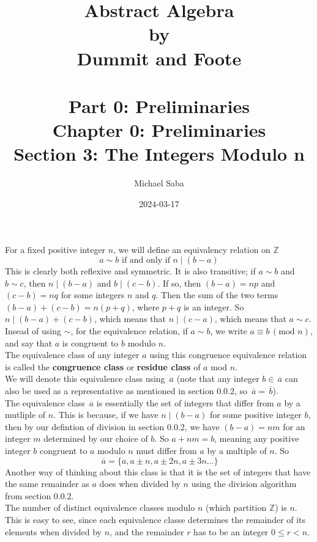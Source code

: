 \documentclass[12pt]{article}
\title{%
    \Huge Abstract Algebra \\
    \large by \\
    \Large Dummit and Foote \\~\\
    \huge Part 0: Preliminaries \\
    \LARGE Chapter 0: Preliminaries \\
    \Large Section 3: The Integers Modulo n
}
\date{2024-03-17}
\author{Michael Saba}
\newcommand{\Z}{\mathbb{Z}}
\newcommand{\olsi}[1]{\,\overline{{#1}}}
\begin{document}
    \maketitle
    \newpage

    For a fixed positive integer $n$,
    we will define an equivalency relation on $\Z$
    \[ a \sim b \text{ if and only if } n \mid (b - a) \]
    This is clearly both reflexive and symmetric.
    It is also transitive;
    if $a \sim b$ and $b \sim c$,
    then $n \mid (b-a)$ and $b \mid (c-b)$.
    If so, then $(b-a) = np$ and $(c-b) = nq$
    for some integers $n$ and $q$.
    Then the sum of the two terms $(b-a) + (c-b) = n(p+q)$,
    where $p+q$ is an integer.
    So $n \mid (b-a) + (c-b)$,
    which means that $n \mid (c-a)$,
    which means that $a \sim c$. \\
    Insead of using $\sim$,
    for the equivalence relation,
    if $a \sim b$,
    we write $a \equiv b \, (\text{mod }n)$,
    and say that $a$ is congruent to $b$ modulo $n$. \\
    The equivalence class of any integer $a$
    using this congruence equivalence relation
    is called the \textbf{congruence class} or \textbf{residue class}
    of $a$ mod $n$. \\
    We will denote this equivalence class using $\olsi{a}$
    (note that any integer $b \in \olsi{a}$ can also be used
    as a representative as mentioned in section 0.0.2,
    so $\olsi{a} = \olsi{b}$). \\

    The equivalence class $\olsi{a}$ is essentially the set 
    of integers that differ from $a$ by a mutliple of $n$.
    This is because, if we have $n \mid (b - a)$
    for some positive integer $b$,
    then by our defintion of division in section 0.0.2,
    we have $(b-a) = nm$ for an integer $m$
    determined by our choice of $b$.
    So $a + nm = b$,
    meaning any positive integer $b$ congruent to $a$ modulo $n$
    must differ from $a$ by a multiple of $n$.
    So
    \[ \olsi{a} = \{ a, a \pm n, a \pm 2n, a \pm 3n \dots \} \]
    Another way of thinking about this class is that it is the set
    of integers that have the same remainder as $a$ does
    when divided by $n$ using the division algorithm from section 0.0.2. \\

    The number of distinct equivalence classes modulo $n$
    (which partition $\Z$) is $n$.
    This is easy to see, since each equivalence classe
    determines the remainder of its elements when divided by $n$,
    and the remainder $r$ has to be an integer $0 \leqslant r < n$. \\
    
\end{document}
